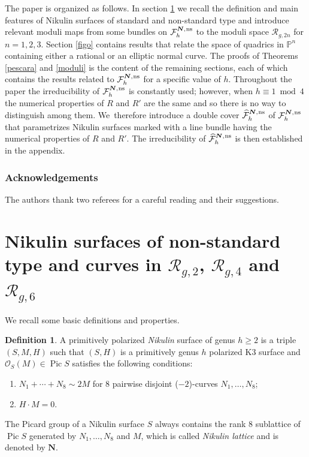 \documentclass[11pt]{article}
\newcommand{\ns}{{\mkern1mu\mathrm{ns}}}
\newcommand{\bN}{\boldsymbol{N}}
\theoremstyle{plain}
\theoremstyle{definition}
\newtheorem{definition}[thm]{Definition}
\DeclareMathOperator{\Pic}{Pic}
\newcommand\PP{{\mathbb P}}
\newcommand\F{{\mathcal F}}
\renewcommand\O{{\mathcal O}}
\newcommand\R{{\mathcal R}}
\begin{document}
The paper is organized as follows. In section \ref{sec:def} we recall the definition and main features of Nikulin surfaces of standard and non-standard type and introduce relevant moduli maps from some bundles on $\F_h^{\bN,\ns}$ to the moduli space $\R_{g,2n}$ for $n=1,2,3$. Section \ref{figo} contains results that relate the space of quadrics in $\PP^n$ containing either a rational or an elliptic normal curve. The proofs of Theorems \ref{pescara} and \ref{moduli} is the content of the remaining sections, each of which contains the results related to $\F_h^{\bN,\ns}$ for a specific value of $h$. Throughout the paper the irreducibility of $\F_h^{\bN,\ns}$ is constantly used; however, when $h \equiv 1 \bmod 4$ the numerical properties of $R$ and $R'$ are the same and so there is no way to distinguish among them. We~therefore introduce a double cover $\widehat{\F}_h^{\bN,\ns}$ of $\F_h^{\bN,\ns}$ that parametrizes Nikulin surfaces marked with a line bundle having the numerical properties of $R$ and $R'$. The irreducibility of $\widehat{\F}_h^{\bN,\ns}$ is then established in the appendix.

\subsubsection*{Acknowledgements} The authors thank two referees for a careful reading and their suggestions.

\section{Nikulin surfaces of non-standard type and curves in \texorpdfstring{$\R_{g,2}$, $\R_{g,4}$ and $\R_{g,6}$}{R}} \label{sec:def}

We recall some basic definitions and properties.
\begin{definition} \label{def:Nik}
A primitively polarized {\it Nikulin} surface of genus $h \geq 2$ is a triple $(S,M,H)$ such that
$(S,H)$ is a primitively genus $h$ polarized K3 surface and $\O_S(M)\in \Pic S$ satisfies the following conditions:
\begin{enumerate}
\item $ N_1+\cdots+N_8 \sim 2M$ for $8$ pairwise disjoint ($-2$)-curves $N_1,\ldots,N_8$;
\item $H \cdot M=0$.
\end{enumerate}
\end{definition}
The Picard group of a Nikulin surface $S$ always contains the rank $8$ sublattice of $\Pic S$ generated by $N_1,\ldots,N_8$ and $M$, which is called {\it Nikulin lattice} and is denoted by $\bN$.
\end{document}
